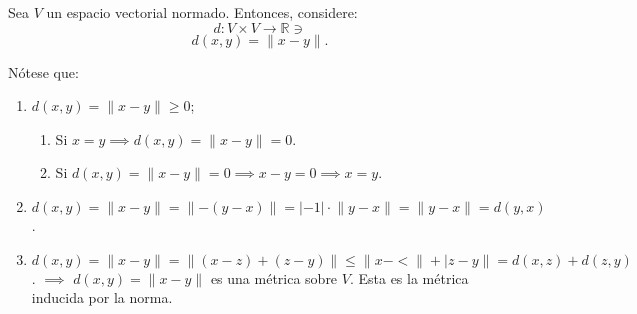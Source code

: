 \begin{nota}
	Sea $V$ un espacio vectorial normado. Entonces, considere: 
	$$d:V\times V \to \mathbb{R}\ni$$
	$$d(x,y)=\lVert x-y \rVert.$$
	
	Nótese que: 
	
	\begin{enumerate}
		\item $d(x,y)=\lVert x-y\rVert \geq 0$; 
		\begin{enumerate}
			\item Si $x=y\implies d(x,y)=\lVert x-y\rVert =0$. 
\item Si $d(x,y)=\lVert x-y \rVert =0 \implies x-y=0 \implies x=y$.		
			\end{enumerate}
		
		\item $d(x,y)=\lVert x-y \rVert = \lVert -(y-x)\rVert = |-1|\cdot \lVert y-x\rVert = \lVert y-x\rVert = d(y,x)$. 
		\item $d(x,y)= \lVert x-y\rVert = \lVert (x-z)+(z-y)\rVert \leq \lVert x-<\rVert + \lvert z-y \rVert = d(x,z)+d(z,y)$. $\implies$ $d(x,y)=\lVert x-y\rVert$ es una métrica sobre $V$. Esta es la métrica inducida por la norma.
	\end{enumerate}
\end{nota}